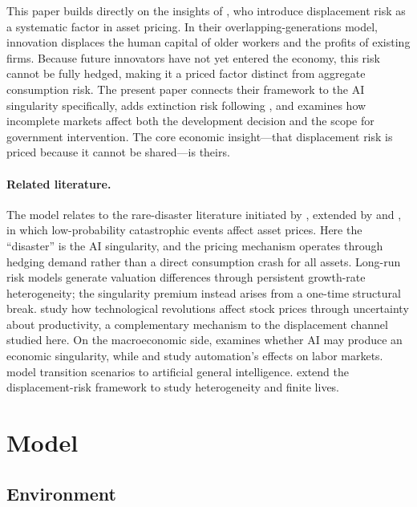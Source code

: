 \documentclass[12pt]{article}
\begin{document}
This paper builds directly on the insights of \citet{GKP2012}, who introduce displacement risk as a systematic factor in asset pricing. In their overlapping-generations model, innovation displaces the human capital of older workers and the profits of existing firms. Because future innovators have not yet entered the economy, this risk cannot be fully hedged, making it a priced factor distinct from aggregate consumption risk. The present paper connects their framework to the AI singularity specifically, adds extinction risk following \citet{Jones2024}, and examines how incomplete markets affect both the development decision and the scope for government intervention. The core economic insight---that displacement risk is priced because it cannot be shared---is theirs.

\paragraph{Related literature.}
The model relates to the rare-disaster literature initiated by \citet{Barro2006}, extended by \citet{Gabaix2012} and \citet{Wachter2013}, in which low-probability catastrophic events affect asset prices. Here the ``disaster'' is the AI singularity, and the pricing mechanism operates through hedging demand rather than a direct consumption crash for all assets. Long-run risk models \citep{BansalYaron2004} generate valuation differences through persistent growth-rate heterogeneity; the singularity premium instead arises from a one-time structural break. \citet{PastorVeronesi2009} study how technological revolutions affect stock prices through uncertainty about productivity, a complementary mechanism to the displacement channel studied here. On the macroeconomic side, \citet{Nordhaus2021} examines whether AI may produce an economic singularity, while \citet{AcemogluRestrepo2018,AcemogluRestrepo2020} and \citet{Autor2015} study automation's effects on labor markets. \citet{KorinekSuh2024} model transition scenarios to artificial general intelligence. \citet{GarleanuPanageas2015} extend the displacement-risk framework to study heterogeneity and finite lives.


\section{Model} %

\subsection{Environment}
\end{document}
